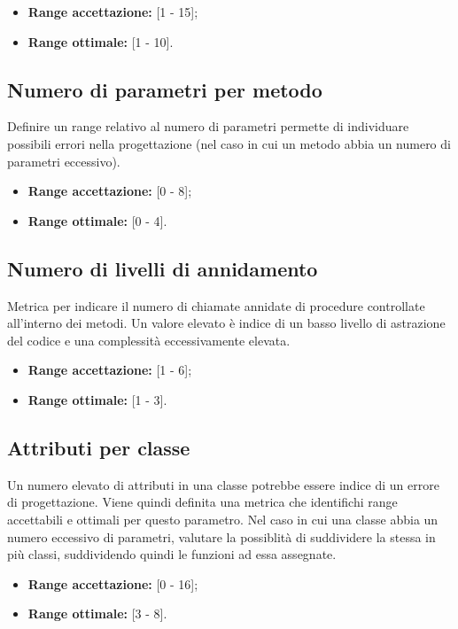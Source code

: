 \begin{itemize}
	\item \textbf{Range accettazione:} [1 - 15];
	\item \textbf{Range ottimale:} [1 - 10].
\end{itemize}

\subsection{Numero di parametri per metodo}
Definire un range relativo al numero di parametri permette di individuare possibili errori nella progettazione (nel caso in cui un metodo abbia un numero di parametri eccessivo).
 
\begin{itemize}
	\item \textbf{Range accettazione:} [0 - 8];
	\item \textbf{Range ottimale:} [0 - 4].
\end{itemize}  


\subsection{Numero di livelli di annidamento}
Metrica per indicare il numero di chiamate annidate di procedure controllate all'interno dei metodi.\newline
Un valore elevato è indice di un basso livello di astrazione del codice e una complessità eccessivamente elevata. 

\begin{itemize}
	\item \textbf{Range accettazione:} [1 - 6];
	\item \textbf{Range ottimale:} [1 - 3].
\end{itemize}  


\subsection{Attributi per classe}
Un numero elevato di attributi in una classe potrebbe essere indice di un errore di progettazione.
Viene quindi definita una metrica che identifichi range accettabili e ottimali per questo parametro.
Nel caso in cui una classe abbia un numero eccessivo di parametri, valutare la possiblità di suddividere la stessa in più classi, suddividendo quindi le funzioni ad essa assegnate.

\begin{itemize}
	\item \textbf{Range accettazione:} [0 - 16];
	\item \textbf{Range ottimale:} [3 - 8].
\end{itemize}  

